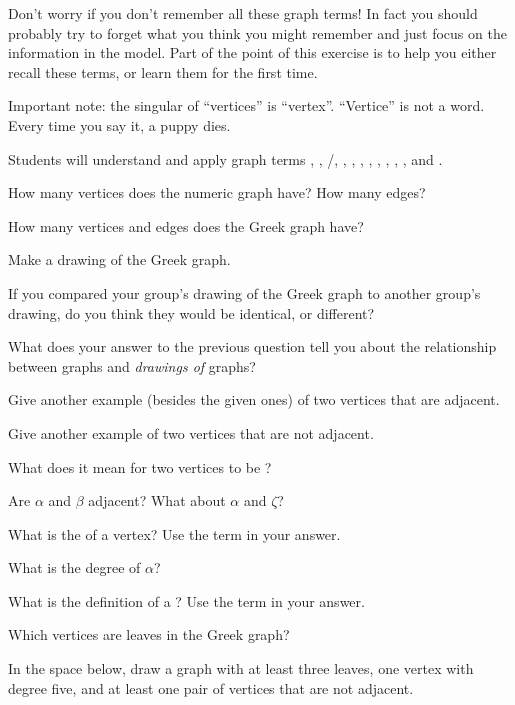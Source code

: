 \documentclass{tufte-handout}
\begin{document}
Don't worry if you don't remember all these graph terms!  In fact you
should probably try to forget what you think you might remember and
just focus on the information in the model. Part of the point of this
exercise is to help you either recall these terms, or learn them for
the first time.

  Important note: the singular of ``vertices'' is
  ``vertex''. ``Vertice'' is not a word.  Every time you say it, a
  puppy dies.

\begin{objective}
  Students will understand and apply graph terms ,
  , /, , ,
  , , ,
  , , , and .
\end{objective}

\begin{questions}
\item How many vertices does the numeric graph have?  How many edges?
\item How many vertices and edges does the Greek graph have?
\item Make a drawing of the Greek graph.
\item If you compared your group's drawing of the Greek graph to
  another group's drawing, do you think they would be identical, or
  different?
\item What does your answer to the previous question tell you about
  the relationship between graphs and \emph{drawings of} graphs?
\item Give another example (besides the given ones) of two vertices
  that are adjacent.
\item Give another example of two vertices that are not adjacent.
\item What does it mean for two vertices to be ?
\item Are $\alpha$ and $\beta$ adjacent?   What about $\alpha$ and $\zeta$?
\item What is the  of a vertex?  Use the term
   in your answer.
\item What is the degree of $\alpha$?
\item What is the definition of a ?  Use the term
   in your answer.
\item Which vertices are leaves in the Greek graph?
\item In the space below, draw a graph with at least three leaves, one
  vertex with degree five, and at least one pair of vertices that are
  not adjacent.
\end{questions}
\end{document}

